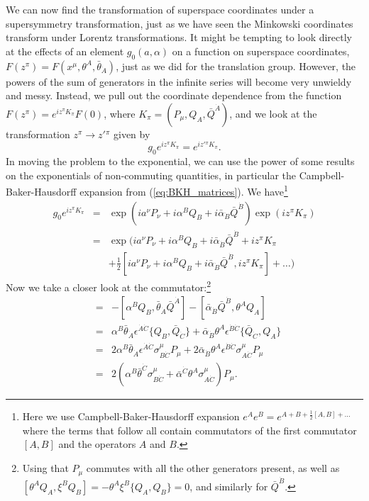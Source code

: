 \documentclass[notes.tex]{subfiles}
\begin{document}
We can now find the transformation of superspace coordinates under a supersymmetry transformation, just as we have seen the Minkowski coordinates transform under Lorentz transformations. It might be tempting to look directly at the effects of an element $g_0(a, \alpha)$ on a function on superspace coordinates, $F(z^\pi) = F(x^\mu, \theta^A, \bar{\theta}_{\dot{A}})$, just as we did for the translation group. However, the powers of the sum of generators in the infinite series will become very unwieldy and messy. Instead, we pull out the coordinate dependence from the function $F(z^\pi) = e^{iz^\pi K_\pi}F(0)$, where $K_\pi=(P_\mu,Q_A,\bar{Q}^{\dot{A}})$,  and we look at the transformation $z^\pi \to z'{}^\pi$ given by
\[g_0e^{iz^\pi K_\pi} = e^{iz'{}^\pi K_\pi}.\]
In moving the problem to the exponential, we can use the power of some results on the exponentials of non-commuting quantities, in particular the Campbell-Baker-Hausdorff expansion from (\ref{eq:BKH_matrices}).
We have\footnote{Here we use Campbell-Baker-Hausdorff expansion $e^{A}e^{B} = e^{A + B + \frac{1}{2}[A, B] + ...}$ where the terms that follow all contain commutators of the first commutator  $[A, B] $ and the operators $A$ and $B$.}
\begin{eqnarray*}
g_0 e^{iz^\pi K_\pi} &=& \exp(ia^\nu P_\nu + i\alpha^BQ_B + i\bar{\alpha}_{\dot{B}}\bar{Q}^{\dot{B}})\exp( iz^\pi K_\pi)\\
&=& \exp(ia^\nu P_\nu + i\alpha^BQ_B + i\bar{\alpha}_{\dot{B}}\bar{Q}^{\dot{B}} + iz^\pi K_\pi\\
&& + \frac{1}{2}[ia^\nu P_\nu + i\alpha^BQ_B + i\bar{\alpha}_{\dot{B}}\bar{Q}^{\dot{B}}, iz^\pi K_\pi] + …)
\end{eqnarray*}
Now we take a closer look at the commutator:\footnote{Using that $P_\mu$ commutes with all the other generators present, as well as $[\theta^A Q_A, \xi^B Q_B] = -\theta^A\xi^B\{Q_A, Q_B\} = 0$, and similarly for $\bar{Q}^{\dot{B}}$.}
\begin{eqnarray*}
[~,~]&=&-[\alpha^BQ_B,\bar{\theta}_{\dot{A}}\bar{Q}^{\dot{A}}] - [\bar{\alpha}_{\dot{B}}\bar{Q}^{\dot{B}}, \theta^AQ_A]\\
&=&\alpha^B\bar{\theta}_{\dot{A}}\epsilon^{\dot{A}\dot{C}}\{Q_B,\bar{Q}_{\dot{C}}\} + \bar{\alpha}_{\dot{B}}\theta^A\epsilon^{\dot{B}\dot{C}}\{\bar{Q}_{\dot{C}}, Q_A\}\\
&=&2\alpha^B\bar{\theta}_{\dot{A}}\epsilon^{\dot{A}\dot{C}}\sigma^\mu_{B\dot{C}}P_\mu + 2\bar{\alpha}_{\dot{B}}\theta^A\epsilon^{\dot{B}\dot{C}}\sigma^\mu_{A\dot{C}}P_\mu\\
&=&2(\alpha^B\bar{\theta}^{\dot{C}}\sigma^\mu_{B\dot{C}} + \bar{\alpha}^{\dot{C}}\theta^A\sigma^\mu_{A\dot{C}})P_\mu .
\end{eqnarray*}
\end{document}
